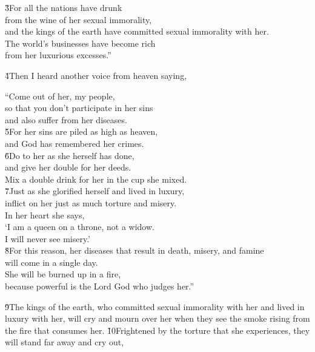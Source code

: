 \begin{poetry}
\poeml \v{3}For all the nations have drunk \\
\poemll    from the wine of her sexual immorality, \\
\poeml and the kings of the earth have committed sexual immorality with her. \\
\poeml The world's businesses have become rich \\
\poemll    from her luxurious excesses.''
\end{poetry}

\v{4}Then I heard another voice from heaven saying,

\begin{poetry}
\poeml ``Come out of her, my people, \\
\poemll    so that you don't participate in her sins \\
\poemlll       and also suffer from her diseases. \\
\poeml \v{5}For her sins are piled as high as heaven, \\
\poemll    and God has remembered her crimes. \\
\poeml \v{6}Do to her as she herself has done, \\
\poemll    and give her double for her deeds. \\
\poeml Mix a double drink for her in the cup she mixed. \\
\poeml \v{7}Just as she glorified herself and lived in luxury, \\
\poemll    inflict on her just as much torture and misery. \\
\poeml In her heart she says, \\
\poemll    `I am a queen on a throne, not a widow. \\
\poemlll       I will never see misery.' \\
\poeml \v{8}For this reason, her diseases that result in death, misery, and famine \\
\poemll    will come in a single day. \\
\poeml She will be burned up in a fire, \\
\poemll    because powerful is the Lord God who judges her.''
\end{poetry}

\v{9}The kings of the earth, who committed sexual immorality with her and lived in luxury with her, will cry and mourn over her when they see the smoke rising from the fire that consumes her. \v{10}Frightened by the torture that she experiences, they will stand far away and cry out,

